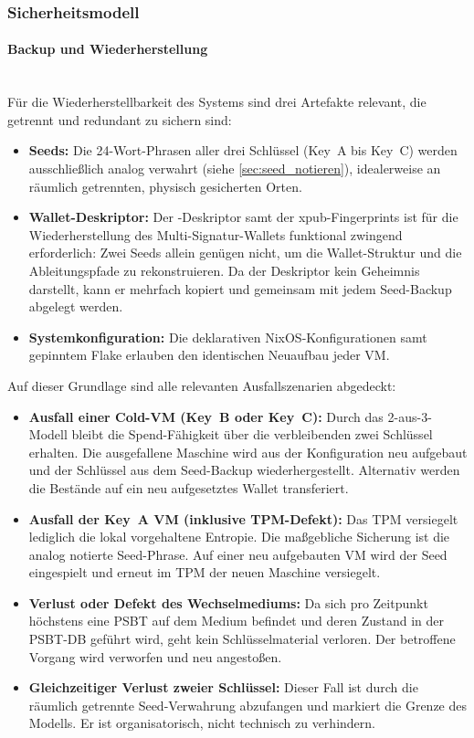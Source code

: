 \subsubsection{Sicherheitsmodell}

\paragraph{Backup und Wiederherstellung} \label{sec:backup} \mbox{}\\
Für die Wiederherstellbarkeit des Systems sind drei Artefakte relevant, die
getrennt und redundant zu sichern sind:
\begin{itemize}
    \item \textbf{Seeds:} Die 24-Wort-Phrasen aller drei Schlüssel (Key~A bis Key~C) werden ausschließlich analog verwahrt (siehe \ref{sec:seed_notieren}), idealerweise an räumlich getrennten, physisch gesicherten Orten.
    \item \textbf{Wallet-Deskriptor:} Der -Deskriptor samt der \ac{xpub}-Fingerprints ist für die Wiederherstellung des Multi-Signatur-Wallets funktional zwingend erforderlich: Zwei Seeds allein genügen nicht, um die Wallet-Struktur und die Ableitungspfade zu rekonstruieren. Da der Deskriptor kein Geheimnis darstellt, kann er mehrfach kopiert und gemeinsam mit jedem Seed-Backup abgelegt werden.
    \item \textbf{Systemkonfiguration:} Die deklarativen NixOS-Konfigurationen samt gepinntem Flake erlauben den identischen Neuaufbau jeder \ac{VM}.
\end{itemize}
Auf dieser Grundlage sind alle relevanten Ausfallszenarien abgedeckt:
\begin{itemize}
    \item \textbf{Ausfall einer Cold-\ac{VM} (Key~B oder Key~C):} Durch das 2-aus-3-Modell bleibt die Spend-Fähigkeit über die verbleibenden zwei Schlüssel erhalten. Die ausgefallene Maschine wird aus der Konfiguration neu aufgebaut und der Schlüssel aus dem Seed-Backup wiederhergestellt. Alternativ werden die Bestände auf ein neu aufgesetztes Wallet transferiert.
    \item \textbf{Ausfall der Key~A \ac{VM} (inklusive \ac{TPM}-Defekt):} Das \ac{TPM} versiegelt lediglich die lokal vorgehaltene Entropie. Die maßgebliche Sicherung ist die analog notierte Seed-Phrase. Auf einer neu aufgebauten \ac{VM} wird der Seed eingespielt und erneut im \ac{TPM} der neuen Maschine versiegelt.
    \item \textbf{Verlust oder Defekt des Wechselmediums:} Da sich pro Zeitpunkt höchstens eine \ac{PSBT} auf dem Medium befindet und deren Zustand in der \ac{PSBT}-\ac{DB} geführt wird, geht kein Schlüsselmaterial verloren. Der betroffene Vorgang wird verworfen und neu angestoßen.
    \item \textbf{Gleichzeitiger Verlust zweier Schlüssel:} Dieser Fall ist durch die räumlich getrennte Seed-Verwahrung abzufangen und markiert die Grenze des Modells. Er ist organisatorisch, nicht technisch zu verhindern.
\end{itemize}




